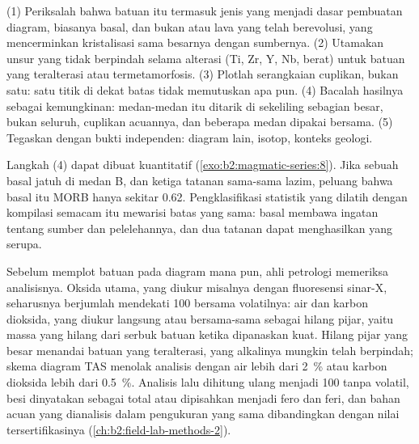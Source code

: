 \begin{method}\label{met:b2:magmatic-series:discrimination}
(1) Periksalah bahwa batuan itu termasuk jenis yang menjadi dasar pembuatan diagram, biasanya basal, dan
bukan  atau lava yang telah berevolusi, yang  mencerminkan kristalisasi sama besarnya
dengan sumbernya. (2) Utamakan unsur yang tidak berpindah selama alterasi (Ti, Zr, Y, Nb,  berat) untuk batuan yang teralterasi atau termetamorfosis. (3) Plotlah serangkaian cuplikan, bukan satu:
satu titik di dekat batas tidak memutuskan apa pun. (4) Bacalah hasilnya sebagai kemungkinan:
medan-medan itu ditarik di sekeliling sebagian besar, bukan seluruh, cuplikan acuannya, dan beberapa medan
dipakai bersama. (5) Tegaskan dengan bukti independen: diagram lain, isotop,
konteks geologi.
\end{method}

Langkah (4) dapat dibuat kuantitatif (\cref{exo:b2:magmatic-series:8}). Jika sebuah basal jatuh di medan B, dan ketiga
tatanan sama-sama lazim, peluang bahwa basal itu MORB hanya sekitar 0.62.
Pengklasifikasi statistik yang dilatih dengan kompilasi semacam itu mewarisi batas yang sama: basal
membawa ingatan tentang sumber dan pelelehannya, dan dua tatanan dapat menghasilkan 
yang serupa.

\begin{inthelab}
Sebelum memplot batuan pada diagram mana pun, ahli petrologi memeriksa analisisnya. Oksida
utama, yang diukur misalnya dengan fluoresensi sinar-X, seharusnya berjumlah mendekati 100
bersama volatilnya: air dan karbon dioksida, yang diukur langsung atau bersama-sama sebagai
hilang pijar, yaitu massa yang hilang dari serbuk batuan ketika dipanaskan kuat. Hilang
pijar yang besar menandai batuan yang teralterasi, yang alkalinya mungkin telah berpindah; skema diagram
TAS menolak analisis dengan air lebih dari \qty{2}{\percent} atau
karbon dioksida lebih dari \qty{0.5}{\percent}. Analisis lalu dihitung ulang menjadi 100 tanpa
volatil, besi dinyatakan sebagai  total atau dipisahkan menjadi fero dan feri,
dan bahan acuan yang dianalisis dalam pengukuran yang sama dibandingkan dengan nilai
tersertifikasinya (\cref{ch:b2:field-lab-methods-2}).
\end{inthelab}

